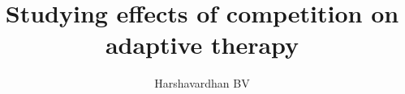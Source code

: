 \documentclass[twoside, 12pt]{iiser-thesis}
\title{Studying effects of competition on adaptive therapy}
\author{Harshavardhan BV }
\begin{document}
	\thesisfront





\printbibliography
\end{document}

